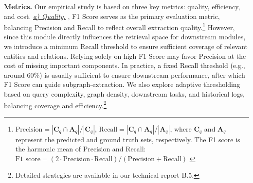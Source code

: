 \textbf{Metrics.} Our empirical study is based on three key metrics: quality, efficiency, and cost.
{\it \underline{a) Quality.}} 
, F1 Score serves as the primary evaluation metric, balancing Precision and Recall to reflect overall extraction quality.\footnote{
$
\text{{Precision}} = |\mathbf{C}_q \cap \mathbf{A}_q| / |\mathbf{C}_q|
$,
$
\text{{Recall}} = |\mathbf{C}_q \cap \mathbf{A}_q| / |\mathbf{A}_q|
$,
where \( \mathbf{C}_q \) and \( \mathbf{A}_q \) represent the predicted and ground truth sets, respectively. The F1 score is the harmonic mean of Precision and Recall:
$
\text{F1 score} = (2 \cdot \text{{Precision}} \cdot \text{{Recall}}) / (\text{Precision} + \text{Recall})
$
\label{footnote:f1}
} 
However, since this module directly influences the retrieval space for downstream modules, we introduce a minimum Recall threshold to ensure sufficient coverage of relevant entities and relations. 
Relying solely on high F1 Score may favor Precision at the cost of missing important components.
In practice, a fixed Recall threshold (e.g., around 60\%) is usually sufficient to ensure downstream performance, after which F1 Score can guide subgraph-extraction.
We also explore adaptive thresholding based on query complexity, graph density, downstream tasks, and historical logs, balancing coverage and efficiency.\footnote{
Detailed strategies are available in our technical report B.5. }

